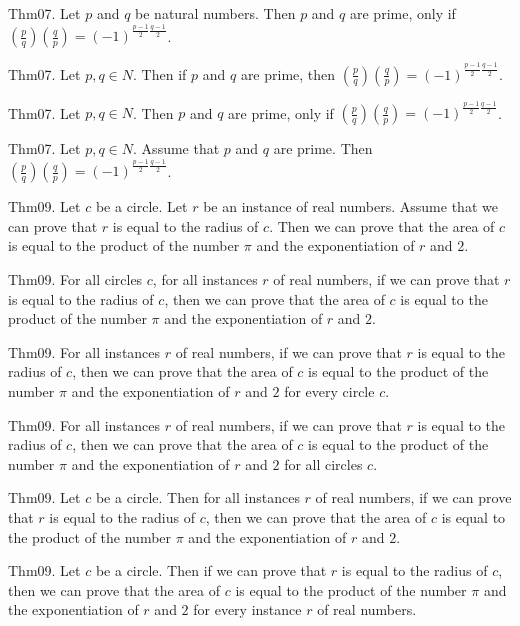\documentclass{article}
\begin{document}
Thm07. Let $p$ and $q$ be natural numbers. Then $p$ and $q$ are prime, only if $\left(\frac{ p }{ q }\right) \left(\frac{ q }{ p }\right) = (- 1)^ {\frac{ p - 1}{2}\frac{ q - 1}{2}}$.

Thm07. Let $p , q \in N$. Then if $p$ and $q$ are prime, then $\left(\frac{ p }{ q }\right) \left(\frac{ q }{ p }\right) = (- 1)^ {\frac{ p - 1}{2}\frac{ q - 1}{2}}$.

Thm07. Let $p , q \in N$. Then $p$ and $q$ are prime, only if $\left(\frac{ p }{ q }\right) \left(\frac{ q }{ p }\right) = (- 1)^ {\frac{ p - 1}{2}\frac{ q - 1}{2}}$.

Thm07. Let $p , q \in N$. Assume that $p$ and $q$ are prime. Then $\left(\frac{ p }{ q }\right) \left(\frac{ q }{ p }\right) = (- 1)^ {\frac{ p - 1}{2}\frac{ q - 1}{2}}$.

Thm09. Let $c$ be a circle. Let $r$ be an instance of real numbers. Assume that we can prove that $r$ is equal to the radius of $c$. Then we can prove that the area of $c$ is equal to the product of the number \(\pi\) and the exponentiation of $r$ and $2$.

Thm09. For all circles $c$, for all instances $r$ of real numbers, if we can prove that $r$ is equal to the radius of $c$, then we can prove that the area of $c$ is equal to the product of the number \(\pi\) and the exponentiation of $r$ and $2$.

Thm09. For all instances $r$ of real numbers, if we can prove that $r$ is equal to the radius of $c$, then we can prove that the area of $c$ is equal to the product of the number \(\pi\) and the exponentiation of $r$ and $2$ for every circle $c$.

Thm09. For all instances $r$ of real numbers, if we can prove that $r$ is equal to the radius of $c$, then we can prove that the area of $c$ is equal to the product of the number \(\pi\) and the exponentiation of $r$ and $2$ for all circles $c$.

Thm09. Let $c$ be a circle. Then for all instances $r$ of real numbers, if we can prove that $r$ is equal to the radius of $c$, then we can prove that the area of $c$ is equal to the product of the number \(\pi\) and the exponentiation of $r$ and $2$.

Thm09. Let $c$ be a circle. Then if we can prove that $r$ is equal to the radius of $c$, then we can prove that the area of $c$ is equal to the product of the number \(\pi\) and the exponentiation of $r$ and $2$ for every instance $r$ of real numbers.
\end{document}
